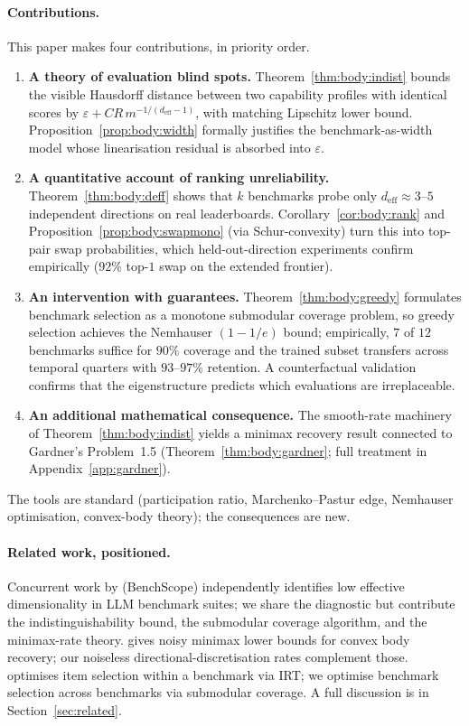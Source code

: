 \documentclass{article}
\begin{document}
\paragraph{Contributions.} This paper makes four contributions, in
priority order.
\begin{enumerate}[leftmargin=*, topsep=2pt, itemsep=1pt]
  \item \textbf{A theory of evaluation blind spots.} Theorem~\ref{thm:body:indist}
  bounds the visible Hausdorff distance between two capability
  profiles with identical scores by $\varepsilon + C R\,
  m^{-1/(d_{\mathrm{eff}}-1)}$, with matching Lipschitz lower bound.
  Proposition~\ref{prop:body:width} formally justifies the
  benchmark-as-width model whose linearisation residual is
  absorbed into $\varepsilon$.
  \item \textbf{A quantitative account of ranking unreliability.}
  Theorem~\ref{thm:body:deff} shows that $k$ benchmarks probe only
  $d_{\mathrm{eff}} \approx 3$--$5$ independent directions on real
  leaderboards. Corollary~\ref{cor:body:rank} and
  Proposition~\ref{prop:body:swapmono} (via Schur-convexity) turn
  this into top-pair swap probabilities, which held-out-direction
  experiments confirm empirically ($92\%$ top-$1$ swap on the
  extended frontier).
  \item \textbf{An intervention with guarantees.}
  Theorem~\ref{thm:body:greedy} formulates benchmark selection as a
  monotone submodular coverage problem, so greedy selection achieves
  the Nemhauser $(1-1/e)$ bound; empirically, $7$ of $12$ benchmarks
  suffice for $90\%$ coverage and the trained subset transfers across
  temporal quarters with $93$--$97\%$ retention. A counterfactual
  validation confirms that the eigenstructure predicts which
  evaluations are irreplaceable.
  \item \textbf{An additional mathematical consequence.} The
  smooth-rate machinery of Theorem~\ref{thm:body:indist} yields a
  minimax recovery result connected to Gardner's Problem~1.5
  (Theorem~\ref{thm:body:gardner}; full treatment in
  Appendix~\ref{app:gardner}).
\end{enumerate}
The tools are standard (participation ratio, Marchenko--Pastur edge,
Nemhauser optimisation, convex-body theory); the consequences are new.

\paragraph{Related work, positioned.} Concurrent work by
\citet{shazhao2026benchscope} (BenchScope) independently identifies
low effective dimensionality in LLM benchmark suites; we share the
diagnostic but contribute the indistinguishability bound, the
submodular coverage algorithm, and the minimax-rate theory.
\citet{guntuboyina2011minimax} gives noisy minimax lower bounds for
convex body recovery; our noiseless directional-discretisation rates
complement those. \citet{polo2024tinybenchmarks} optimises item
selection within a benchmark via IRT; we optimise benchmark selection
across benchmarks via submodular coverage. A full discussion is in
Section~\ref{sec:related}.
\end{document}
